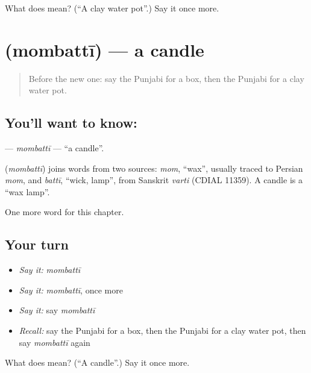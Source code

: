 \begin{tcolorbox}[breakable,colback=teal!4,colframe=teal!35!black,title={Before you move on}]
What does  mean? (\textquotedblleft{}A clay water pot\textquotedblright{}.) Say it once more.
\end{tcolorbox}
\section[\texorpdfstring{\pa{ਮੋਮਬੱਤੀ} (mombattī)}{ਮੋਮਬੱਤੀ (mombattī)}]{ (mombattī) — a candle}

\label{lesson:PA-C117-mombatti}



\begin{quote}
Before the new one: say the Punjabi for a box, then the Punjabi for a clay water pot.
\end{quote}

\subsection*{You'll want to know: }
\textbf{} — \emph{mombattī} — \textquotedblleft{}a candle\textquotedblright{}.

\begin{cousinweb}
\textbf{} (\emph{mombattī}) joins words from two sources: \emph{mom}, \textquotedblleft{}wax\textquotedblright{}, usually traced to Persian \emph{mom}, and \emph{battī}, \textquotedblleft{}wick, lamp\textquotedblright{}, from Sanskrit \emph{varti} (CDIAL 11359). A candle is a \textquotedblleft{}wax lamp\textquotedblright{}.
\end{cousinweb}

\begin{grammarlens}[title={What you've built}]
One more word for this chapter.
\end{grammarlens}

\subsection*{Your turn}
\begin{itemize}
\raggedright
  \item \emph{Say it:} \emph{mombattī}
  \item \emph{Say it:} \emph{mombattī}, once more
  \item \emph{Say it:} say \emph{mombattī}
  \item \emph{Recall:} say the Punjabi for a box, then the Punjabi for a clay water pot, then say \emph{mombattī} again
\end{itemize}

\begin{tcolorbox}[breakable,colback=teal!4,colframe=teal!35!black,title={Before you move on}]
What does  mean? (\textquotedblleft{}A candle\textquotedblright{}.) Say it once more.
\end{tcolorbox}
